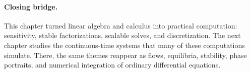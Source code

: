 \paragraph{Closing bridge.}
This chapter turned linear algebra and calculus into practical computation: sensitivity, stable factorizations, scalable solves, and discretization. The next chapter studies the continuous-time systems that many of these computations simulate. There, the same themes reappear as flows, equilibria, stability, phase portraits, and numerical integration of ordinary differential equations.

\clearpage
